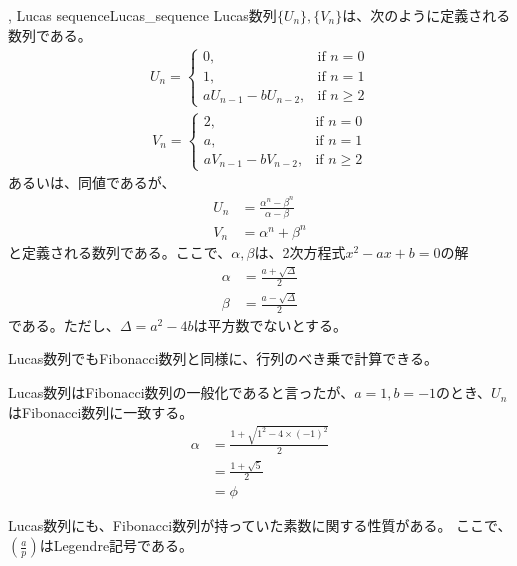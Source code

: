 \begin{Defi}{, Lucas sequence}{Lucas_sequence}
Lucas数列$\{U_n\},\{V_n\}$は、次のように定義される数列である。
\begin{align*}
U_n =
\begin{cases}
0, &\mbox{if } n = 0\\
1, &\mbox{if } n = 1\\
aU_{n - 1} - bU_{n - 2}, &\mbox{if } n \ge 2
\end{cases}
\end{align*}
\begin{align*}
V_n =
\begin{cases}
2, &\mbox{if } n = 0\\
a, &\mbox{if } n = 1\\
aV_{n - 1} - bV_{n - 2}, &\mbox{if } n \ge 2
\end{cases}
\end{align*}
あるいは、同値であるが、
\begin{align*}
U_n &= \frac{\alpha^n - \beta^n}{\alpha - \beta}\\
V_n &= \alpha^n + \beta^n
\end{align*}
と定義される数列である。ここで、$\alpha, \beta$は、2次方程式$x^2-ax+b=0$の解
\begin{align*}
\alpha &= \frac{a+\sqrt{\Delta}}{2}\\
\beta &= \frac{a-\sqrt{\Delta}}{2}
\end{align*}
である。ただし、$\Delta=a^2 - 4b$は平方数でないとする。
\end{Defi}


Lucas数列でもFibonacci数列と同様に、行列のべき乗で計算できる。


Lucas数列はFibonacci数列の一般化であると言ったが、$a=1, b=-1$のとき、$U_n$はFibonacci数列に一致する。
\begin{align*}
\alpha &= \frac{1 + \sqrt{1^2 - 4 \times (-1)^2}}{2}\\
&= \frac{1 + \sqrt{5}}{2}\\
&= \phi
\end{align*}

Lucas数列にも、Fibonacci数列が持っていた素数に関する性質がある。
ここで、$\left(\frac{a}{p}\right)$はLegendre記号である。


